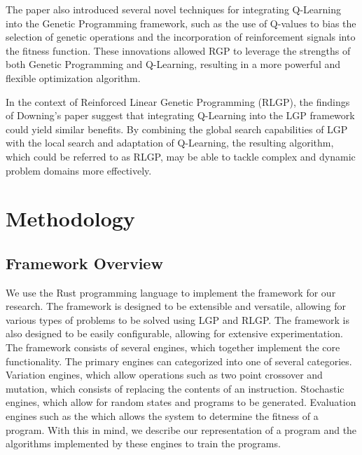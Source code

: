 \documentclass[12pt, final]{dalcsthesis}
\begin{document}
The paper also introduced several novel techniques for integrating Q-Learning into the Genetic Programming framework, such as the use of Q-values to bias the selection of genetic operations and the incorporation of reinforcement signals into the fitness function. These innovations allowed RGP to leverage the strengths of both Genetic Programming and Q-Learning, resulting in a more powerful and flexible optimization algorithm.

In the context of Reinforced Linear Genetic Programming (RLGP), the findings of Downing's paper suggest that integrating Q-Learning into the LGP framework could yield similar benefits. By combining the global search capabilities of LGP with the local search and adaptation of Q-Learning, the resulting algorithm, which could be referred to as RLGP, may be able to tackle complex and dynamic problem domains more effectively.

\chapter{Methodology}
\section{Framework Overview}
We use the Rust programming language to implement the framework for our research. The framework is designed to be extensible and versatile, allowing
for various types of problems to be solved using LGP and RLGP. The framework is also designed to be easily configurable, allowing for extensive experimentation. The framework consists of several engines, which together implement the core functionality. The primary engines can categorized into one of several categories. Variation engines, which allow operations such as two point crossover and mutation, which consists of replacing the contents of an instruction. Stochastic engines, which allow for random states and programs to be generated. Evaluation engines such as the which allows the system to determine the fitness of a program. With this in mind, we describe our representation of a program and the algorithms implemented by these engines to train the programs.
\end{document}
